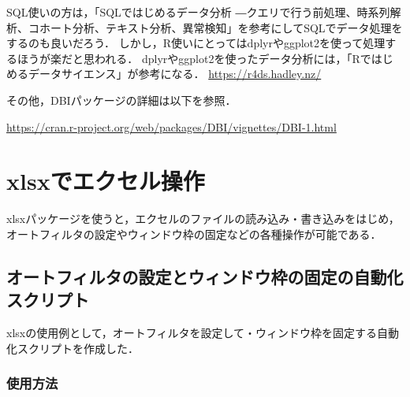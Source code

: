 \documentclass[
]{article}
\begin{document}
SQL使いの方は，「SQLではじめるデータ分析 ―クエリで行う前処理、時系列解析、コホート分析、テキスト分析、異常検知」を参考にしてSQLでデータ処理をするのも良いだろう．
しかし，R使いにとってはdplyrやggplot2を使って処理するほうが楽だと思われる．
dplyrやggplot2を使ったデータ分析には，「Rではじめるデータサイエンス」が参考になる．
\url{https://r4ds.hadley.nz/}

その他，DBIパッケージの詳細は以下を参照．

\url{https://cran.r-project.org/web/packages/DBI/vignettes/DBI-1.html}

\hypertarget{xlsx}{%
\section{xlsxでエクセル操作}\label{xlsx}}

xlsxパッケージを使うと，エクセルのファイルの読み込み・書き込みをはじめ，
オートフィルタの設定やウィンドウ枠の固定などの各種操作が可能である．

\hypertarget{ux30aaux30fcux30c8ux30d5ux30a3ux30ebux30bfux306eux8a2dux5b9aux3068ux30a6ux30a3ux30f3ux30c9ux30a6ux67a0ux306eux56faux5b9aux306eux81eaux52d5ux5316ux30b9ux30afux30eaux30d7ux30c8}{%
\subsection{オートフィルタの設定とウィンドウ枠の固定の自動化スクリプト}\label{ux30aaux30fcux30c8ux30d5ux30a3ux30ebux30bfux306eux8a2dux5b9aux3068ux30a6ux30a3ux30f3ux30c9ux30a6ux67a0ux306eux56faux5b9aux306eux81eaux52d5ux5316ux30b9ux30afux30eaux30d7ux30c8}}

xlsxの使用例として，オートフィルタを設定して・ウィンドウ枠を固定する自動化スクリプトを作成した．

\hypertarget{ux4f7fux7528ux65b9ux6cd5}{%
\subsubsection{使用方法}\label{ux4f7fux7528ux65b9ux6cd5}}
\end{document}
